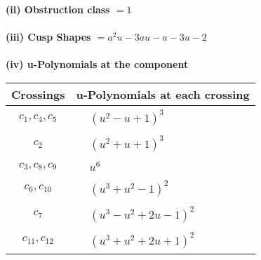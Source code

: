 \documentclass[1p]{elsarticle_modified}
\theoremstyle{definition}
\begin{document}
\flushleft \textbf{(ii) Obstruction class $= 1$}\\~\\
\flushleft \textbf{(iii) Cusp Shapes $= a^2 u-3 a u- a-3 u-2$}\\~\\
\newpage\renewcommand{\arraystretch}{1}
\flushleft \textbf{(iv) u-Polynomials at the component}\newline \\
\begin{tabular}{m{50pt}|m{274pt}}
Crossings & \hspace{64pt}u-Polynomials at each crossing \\
\hline $$\begin{aligned}c_{1},c_{4},c_{5}\end{aligned}$$&$\begin{aligned}
&(u^2- u+1)^3
\end{aligned}$\\
\hline $$\begin{aligned}c_{2}\end{aligned}$$&$\begin{aligned}
&(u^2+u+1)^3
\end{aligned}$\\
\hline $$\begin{aligned}c_{3},c_{8},c_{9}\end{aligned}$$&$\begin{aligned}
&u^6
\end{aligned}$\\
\hline $$\begin{aligned}c_{6},c_{10}\end{aligned}$$&$\begin{aligned}
&(u^3+u^2-1)^2
\end{aligned}$\\
\hline $$\begin{aligned}c_{7}\end{aligned}$$&$\begin{aligned}
&(u^3- u^2+2 u-1)^2
\end{aligned}$\\
\hline $$\begin{aligned}c_{11},c_{12}\end{aligned}$$&$\begin{aligned}
&(u^3+u^2+2 u+1)^2
\end{aligned}$\\
\hline
\end{tabular}\\~\\
\end{document}
